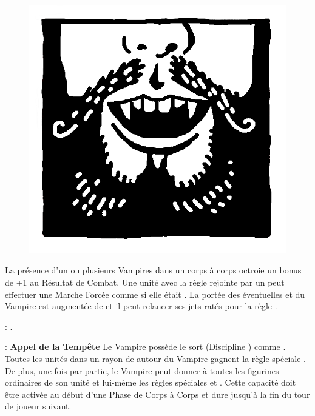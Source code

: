 \begin{figure}
\centering
\includegraphics[width=\logosize]{logos/logo_vonkarnstein.png}
\end{figure}
La présence d'un ou plusieurs Vampires \vonkarnstein{} dans un corps à corps octroie un bonus de +1 au Résultat de Combat. Une unité avec la règle \undead{} rejointe par un \vonkarnstein{} peut effectuer une Marche Forcée comme si elle était \vampiric{}. La portée des éventuelles \inspiringpresence{} et \holdyourground{} du Vampire est augmentée de  et il peut relancer ses jets ratés pour la règle \vampiric{}. 

\vspace{0.5cm}
\bloodties{} : \textbf{\darkcoach{}}.

\vspace{0.5cm}
\ancientbloodpower{} : \textbf{Appel de la Tempête}\dotfill{}\newline%
Le Vampire possède le sort \heavensspelltwo{} (Discipline \heavens{}) comme . Toutes les unités dans un rayon de  autour du Vampire gagnent la règle spéciale \hardtarget{}. De plus, une fois par partie, le Vampire peut donner à toutes les figurines ordinaires de son unité et lui-même les règles spéciales \lightningattacks{} et \lightningreflexes{}. Cette capacité doit être activée au début d'une Phase de Corps à Corps et dure jusqu'à la fin du tour de joueur suivant.

